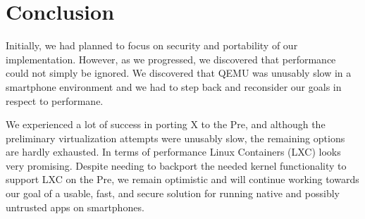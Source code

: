 \section{Conclusion}
\label{sec:conclusion}
Initially, we had planned to focus on security and portability of our implementation.  However, as we progressed, we discovered that performance could not simply be ignored.  We discovered that QEMU was unusably slow in a smartphone environment and we had to step back and reconsider our goals in respect to performane.

We experienced a lot of success in porting X to the Pre, and although the preliminary virtualization attempts were unusably slow, the remaining options are hardly exhausted.  In terms of performance Linux Containers (LXC) looks very promising.  Despite needing to backport the needed kernel functionality to support LXC on the Pre, we remain optimistic and will continue working towards our goal of a usable, fast, and secure solution for running native and possibly untrusted apps on smartphones.

